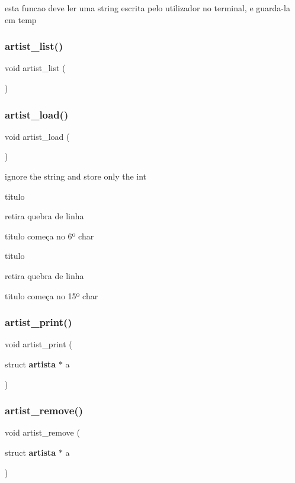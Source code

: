 esta funcao deve ler uma string escrita pelo utilizador no terminal, e guarda-\/la em temp \mbox{\label{project_8h_a8f711ef177fff9555d0d9b7dbd02fe0e}} 
\subsubsection{artist\_list()}
{\footnotesize\ttfamily void artist\+\_\+list (\begin{DoxyParamCaption}{ }\end{DoxyParamCaption})}

\mbox{\label{project_8h_ac92e93ea1e283f63cd157c3de3bda0d2}} 
\subsubsection{artist\_load()}
{\footnotesize\ttfamily void artist\+\_\+load (\begin{DoxyParamCaption}{ }\end{DoxyParamCaption})}

ignore the string and store only the int

titulo

retira quebra de linha

titulo começa no 6º char

titulo

retira quebra de linha

titulo começa no 15º char \mbox{\label{project_8h_a0b753a63f0f576d94160e7d073332c66}} 
\subsubsection{artist\_print()}
{\footnotesize\ttfamily void artist\+\_\+print (\begin{DoxyParamCaption}\item[{struct \textbf{ artista} $\ast$}]{a }\end{DoxyParamCaption})}

\mbox{\label{project_8h_abc42f3a57f943f92d23752d9650031f9}} 
\subsubsection{artist\_remove()}
{\footnotesize\ttfamily void artist\+\_\+remove (\begin{DoxyParamCaption}\item[{struct \textbf{ artista} $\ast$}]{a }\end{DoxyParamCaption})}

